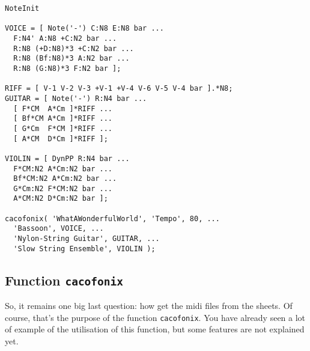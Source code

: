 \documentclass{article}
\begin{document}

\begin{lstlisting}
NoteInit

VOICE = [ Note('-') C:N8 E:N8 bar ...
  F:N4' A:N8 +C:N2 bar ...
  R:N8 (+D:N8)*3 +C:N2 bar ...
  R:N8 (Bf:N8)*3 A:N2 bar ...
  R:N8 (G:N8)*3 F:N2 bar ];

RIFF = [ V-1 V-2 V-3 +V-1 +V-4 V-6 V-5 V-4 bar ].*N8;
GUITAR = [ Note('-') R:N4 bar ...
  [ F*CM  A*Cm ]*RIFF ...
  [ Bf*CM A*Cm ]*RIFF ...
  [ G*Cm  F*CM ]*RIFF ...
  [ A*CM  D*Cm ]*RIFF ];

VIOLIN = [ DynPP R:N4 bar ...
  F*CM:N2 A*Cm:N2 bar ...
  Bf*CM:N2 A*Cm:N2 bar ...
  G*Cm:N2 F*CM:N2 bar ...
  A*CM:N2 D*Cm:N2 bar ];

cacofonix( 'WhatAWonderfulWorld', 'Tempo', 80, ...
  'Bassoon', VOICE, ...
  'Nylon-String Guitar', GUITAR, ...
  'Slow String Ensemble', VIOLIN );
\end{lstlisting}

\subsection{Function \lstinline!cacofonix!}
\label{sec:CacofonixFunction}

So, it remains one big last question: how get the midi files from the sheets. Of course, that's the purpose of the function \lstinline!cacofonix!. You have already seen a lot of example of the utilisation of this function, but some features are not explained yet.
\end{document}
